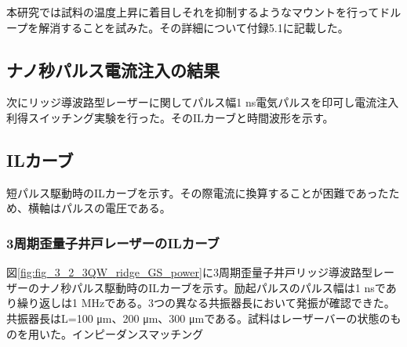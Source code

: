 {本研究では試料の温度上昇に着目しそれを抑制するようなマウントを行ってドループを解消することを試みた。その詳細について付録5.1に記載した。

\clearpage
\subsection{ナノ秒パルス電流注入の結果}

次にリッジ導波路型レーザーに関してパルス幅1 ns電気パルスを印可し電流注入利得スイッチング実験を行った。そのILカーブと時間波形を示す。
\subsection{ILカーブ}
短パルス駆動時のILカーブを示す。その際電流に換算することが困難であったため、横軸はパルスの電圧である。
\subsubsection{3周期歪量子井戸レーザーのILカーブ}
図\ref{fig:fig_3_2_3QW_ridge_GS_power}に3周期歪量子井戸リッジ導波路型レーザーのナノ秒パルス駆動時のILカーブを示す。励起パルスのパルス幅は1 nsであり繰り返しは1 MHzである。3つの異なる共振器長において発振が確認できた。共振器長はL=100 \si{\micro\metre}、200 \si{\micro\metre}、300 \si{\micro\metre}である。試料はレーザーバーの状態のものを用いた。インピーダンスマッチング

}
